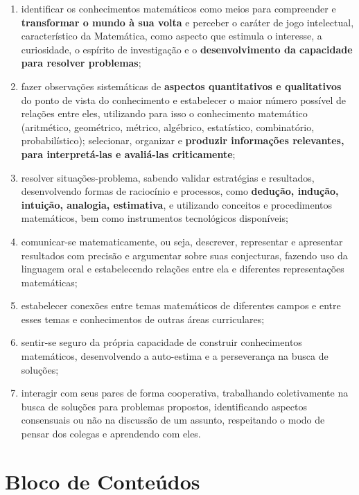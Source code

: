 \begin{enumerate}
    \item identificar os conhecimentos matemáticos como meios para compreender e \textbf{transformar o mundo à sua volta} e perceber o caráter de jogo intelectual, característico da Matemática, como aspecto que estimula o interesse, a curiosidade, o espírito de investigação e o \textbf{desenvolvimento da capacidade para resolver problemas};
    
    \item fazer observações sistemáticas de \textbf{aspectos quantitativos e qualitativos} do ponto de vista do conhecimento e estabelecer o maior número possível de relações entre eles, utilizando para isso o conhecimento matemático (aritmético, geométrico, métrico, algébrico, estatístico, combinatório, probabilístico); selecionar, organizar e \textbf{produzir informações relevantes, para interpretá-las e avaliá-las criticamente};
    
    \item resolver situações-problema, sabendo validar estratégias e resultados, desenvolvendo formas de raciocínio e processos, como \textbf{dedução, indução, intuição, analogia, estimativa}, e utilizando conceitos e procedimentos matemáticos, bem como instrumentos tecnológicos disponíveis;
    
    \item comunicar-se matematicamente, ou seja, descrever, representar e apresentar resultados com precisão e argumentar sobre suas conjecturas, fazendo uso da linguagem oral e estabelecendo relações entre ela e diferentes representações matemáticas;
    
    \item estabelecer conexões entre temas matemáticos de diferentes campos e entre esses temas e conhecimentos de outras áreas curriculares;
    
    \item sentir-se seguro da própria capacidade de construir conhecimentos matemáticos, desenvolvendo a auto-estima e a perseverança na busca de soluções;
    
    \item interagir com seus pares de forma cooperativa, trabalhando coletivamente na busca de soluções para problemas propostos, identificando aspectos consensuais ou não na discussão de um assunto, respeitando o modo de pensar dos colegas e aprendendo com eles.
\end{enumerate}

\section{Bloco de Conteúdos}

